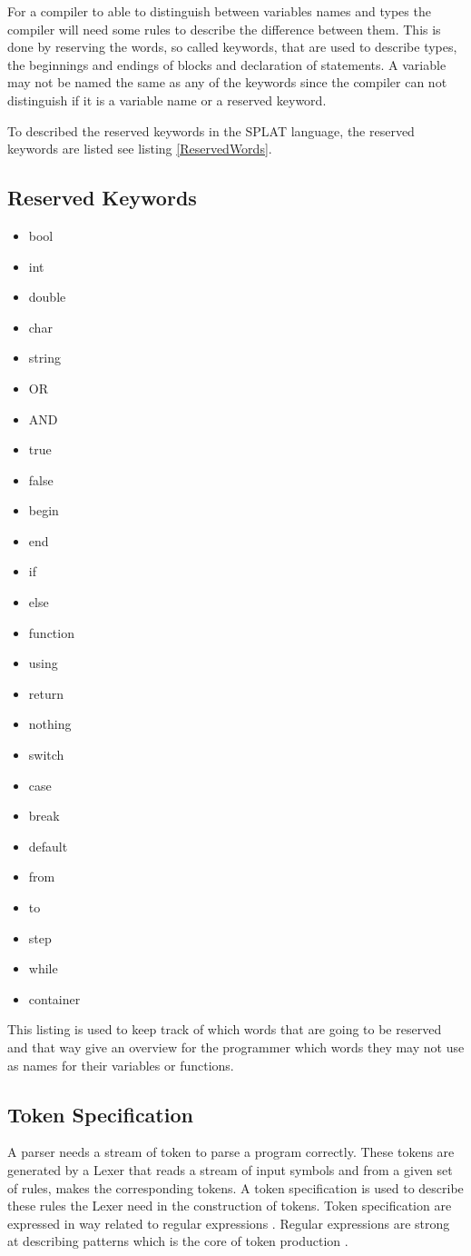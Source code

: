 For a compiler to able to distinguish between variables names and types the compiler will need some rules to describe the difference between them. This is done by reserving the words, so called keywords, that are used to describe types, the beginnings and endings of blocks and declaration of statements. A variable may not be named the same as any of the keywords since the compiler can not distinguish if it is a variable name or a reserved keyword.

To described the reserved keywords in the SPLAT language, the reserved keywords are listed see listing \ref{ReservedWords}.
\subsection{Reserved Keywords}
\begin{itemize}
\label{lst:ReservedWords}
\item bool
\item int
\item double
\item char
\item string
\item OR
\item AND
\item true
\item false
\item begin
\item end
\item if
\item else
\item function
\item using
\item return
\item nothing
\item switch
\item case
\item break
\item default
\item from
\item to
\item step
\item while
\item container

\end{itemize}
This listing is used to keep track of which words that are going to be reserved and that way give an overview for the programmer which words they may not use as names for their variables or functions. 

\subsection{Token Specification}
A parser needs a stream of token to parse a program correctly. These tokens are generated by a Lexer that reads a stream of input symbols and from a given set of rules, makes the corresponding tokens. A token specification is used to describe these rules the Lexer need in the construction of tokens. Token specification are expressed in way related to regular expressions \citep{sebasta}. Regular expressions are strong at describing patterns which is the core of token production \citep{sipser}.


